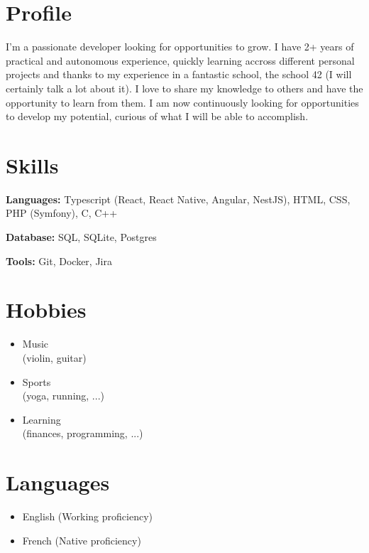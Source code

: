 \documentclass[11pt, oneside, a4paper, titlepage]{article}
\begin{document}
\vspace*{0.5cm}
\begin{tcolorbox}[colframe=white, colback=white]

  \begin{minipage}[t]{0.35\linewidth}

    \section*{Profile}
    I'm a passionate developer looking for
    opportunities to grow. I have 2+ years
    of practical and autonomous experience,
    quickly learning accross different 
    personal projects and thanks to my 
    experience in a fantastic school, 
    the school 42 (I will certainly talk
    a lot about it). \medbreak
    I love to share my knowledge to others 
    and have the opportunity to learn from 
    them. \medbreak
    I am now continuously looking for 
    opportunities to develop my potential, 
    curious of what I will be able to 
    accomplish.

    \section*{Skills}
    \small{
      \textbf{Languages: }Typescript (React, React Native, Angular, NestJS), 
      HTML, CSS, PHP (Symfony), C, C++
    }
    \vspace{0.3cm}
    
    \small{
      \textbf{Database: }SQL, SQLite, Postgres
    }
    \vspace{0.3cm}

    \small{
      \textbf{Tools: }Git, Docker, Jira
    }

    \section*{Hobbies}
    \begin{itemize}
      \item{Music \\(violin, guitar)}
      \item{Sports \\(yoga, running, ...)}
      \item{Learning \\(finances, programming, ...)}
    \end{itemize}

    \section*{Languages}
    \begin{itemize}
      \item{English (Working proficiency)}
      \item{French (Native proficiency)}
    \end{itemize}


\end{minipage}
\end{tcolorbox}
\end{document}
